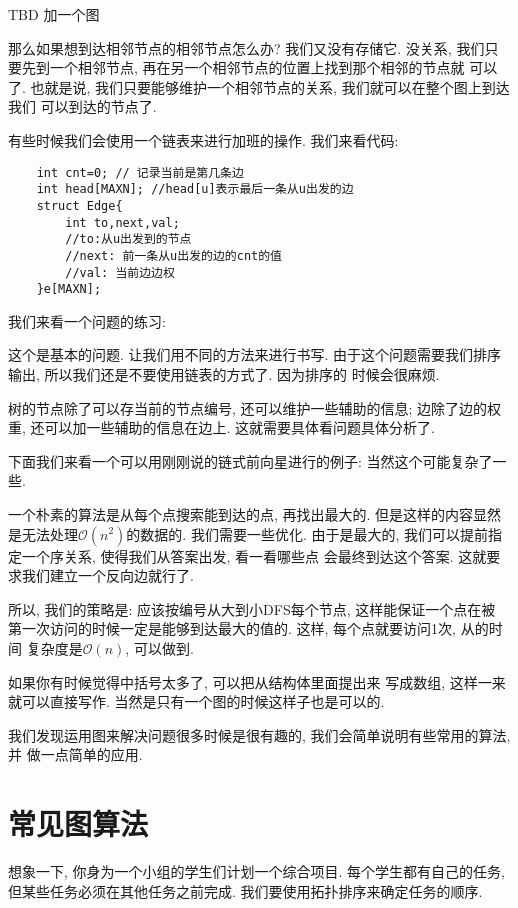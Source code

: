 TBD 加一个图

那么如果想到达相邻节点的相邻节点怎么办? 我们又没有存储它.
没关系, 我们只要先到一个相邻节点, 再在另一个相邻节点的位置上找到那个相邻的节点就
可以了. 也就是说, 我们只要能够维护一个相邻节点的关系, 我们就可以在整个图上到达我们
可以到达的节点了. 

 有些时候我们会使用一个链表来进行加班的操作. 
我们来看代码: 

\begin{lstlisting}
    int cnt=0; // 记录当前是第几条边
    int head[MAXN]; //head[u]表示最后一条从u出发的边
    struct Edge{
        int to,next,val;
        //to:从u出发到的节点
	    //next: 前一条从u出发的边的cnt的值
	    //val: 当前边边权
    }e[MAXN];
\end{lstlisting}

我们来看一个问题的练习: 

 这个是基本的问题. 让我们用不同的方法来进行书写. 
由于这个问题需要我们排序输出, 所以我们还是不要使用链表的方式了. 因为排序的
时候会很麻烦. 

树的节点除了可以存当前的节点编号, 还可以维护一些辅助的信息; 边除了边的权重, 
还可以加一些辅助的信息在边上. 这就需要具体看问题具体分析了. 

下面我们来看一个可以用刚刚说的链式前向星进行的例子: 当然这个可能复杂了一些. 

 一个朴素的算法是从每个点搜索能到达的点, 再找出最大的.
但是这样的内容显然是无法处理$\mathcal O(n^2)$的数据的. 我们需要一些优化. 
由于是最大的, 我们可以提前指定一个序关系, 使得我们从答案出发, 看一看哪些点
会最终到达这个答案. 这就要求我们建立一个反向边就行了. 

所以, 我们的策略是: 应该按编号从大到小DFS每个节点, 这样能保证一个点在被
第一次访问的时候一定是能够到达最大的值的. 这样, 每个点就要访问1次, 从的时间
复杂度是$\mathcal O(n)$, 可以做到. 

如果你有时候觉得中括号太多了, 可以把从结构体里面提出来
写成数组, 这样一来就可以直接写作. 
当然是只有一个图的时候这样子也是可以的. 

我们发现运用图来解决问题很多时候是很有趣的, 我们会简单说明有些常用的算法, 并
做一点简单的应用. 

\section{常见图算法}

 想象一下, 你身为一个小组的学生们计划一个综合项目. 
每个学生都有自己的任务, 但某些任务必须在其他任务之前完成. 
我们要使用拓扑排序来确定任务的顺序. 

